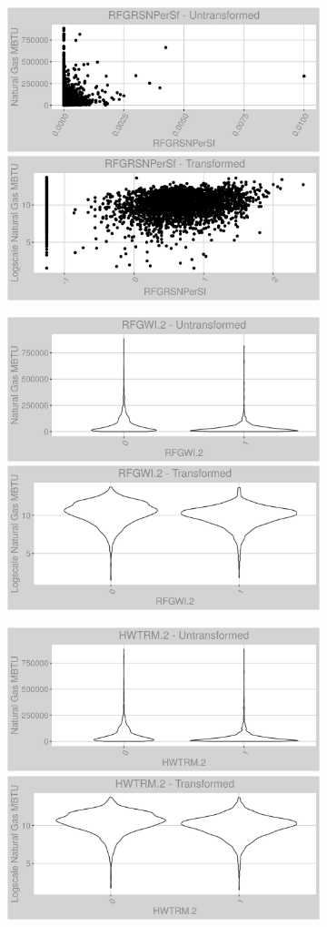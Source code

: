 \FloatBarrier
\newpage
\begin{figure}
\centering
\begin{subfigure}{1\textwidth}
\centering
\includegraphics[width=.49\textwidth, height=0.3\textheight]{Images/natural_gas_psf_var_original_15.png}
\includegraphics[width=.49\textwidth, height=0.3\textheight]{Images/natural_gas_psf_var_transformed_15.png}
\end{subfigure}
\begin{subfigure}{1\textwidth}
\centering
\includegraphics[width=.49\textwidth, height=0.3\textheight]{Images/natural_gas_psf_var_original_16.png}
\includegraphics[width=.49\textwidth, height=0.3\textheight]{Images/natural_gas_psf_var_transformed_16.png}
\end{subfigure}
\begin{subfigure}{1\textwidth}
\centering
\includegraphics[width=.49\textwidth, height=0.3\textheight]{Images/natural_gas_psf_var_original_17.png}
\includegraphics[width=.49\textwidth, height=0.3\textheight]{Images/natural_gas_psf_var_transformed_17.png}
\end{subfigure}
\end{figure}
